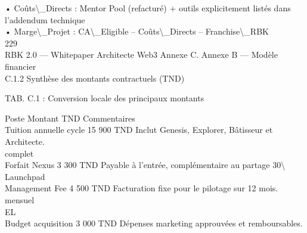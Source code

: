 \documentclass[12pt,landscape,a4paper]{article}
\begin{document}
• Coûts\textbackslash{}_Directs : Mentor Pool (refacturé) + outils explicitement listés dans l’addendum technique\\
\vspace{0.5em}
• Marge\textbackslash{}_Projet : CA\textbackslash{}_Eligible – Coûts\textbackslash{}_Directs – Franchise\textbackslash{}_RBK\\
\vspace{0.5em}
\vspace{0.5em}
\vspace{0.5em}
\vspace{0.5em}
229\\
RBK 2.0 — Whitepaper Architecte Web3                                                                                     Annexe C. Annexe B — Modèle financier\\
\vspace{0.5em}
\vspace{0.5em}
C.1.2 Synthèse des montants contractuels (TND)\\
\vspace{0.5em}
\vspace{0.5em}
\begin{center}\begin{tabular}TAB. C.1 : Conversion locale des principaux montants\end{tabular}\end{center}
\vspace{0.5em}
\vspace{0.5em}
Poste                        Montant TND           Commentaires\\
Tuition annuelle cycle       15 900 TND            Inclut Genesis, Explorer, Bâtisseur et Architecte.\\
complet\\
Forfait Nexus                3 300 TND             Payable à l’entrée, complémentaire au partage 30\textbackslash{}%
Launchpad\\
Management Fee               4 500 TND             Facturation fixe pour le pilotage sur 12 mois.\\
mensuel\\
\vspace{0.5em}
\vspace{0.5em}
\vspace{0.5em}
\vspace{0.5em}
EL\\
Budget acquisition           3 000 TND             Dépenses marketing approuvées et remboursables.\\
\end{document}
